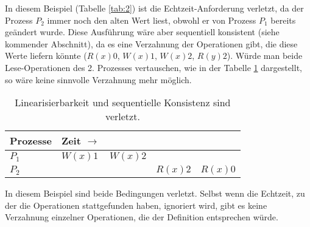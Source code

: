 In diesem Beispiel (Tabelle \ref{tab:2}) ist die Echtzeit-Anforderung verletzt, da der Prozess $P_{2}$ immer noch den alten Wert liest, obwohl er von Prozess $P_{1}$ bereits geändert wurde. Diese Ausführung wäre aber sequentiell konsistent (siehe kommender Abschnitt), da es eine Verzahnung der Operationen gibt, die diese Werte liefern könnte ($R(x)0$, $W(x)1$, $W(x)2$, $R(y)2$). Würde man beide Lese-Operationen des 2. Prozesses vertauschen, wie in der Tabelle \ref{tab:3} dargestellt, so wäre keine sinnvolle Verzahnung mehr möglich.

\begin{table}
	\centering
		\begin{tabular}{l | l l l l}
		\textbf{Prozesse} & \textbf{Zeit} $\rightarrow$ \\
		\hline
		$P_{1}$ & $W(x)1$ & $W(x)2$ \\
		$P_{2}$ & & & \color{red} $R(x)2$ & \color{red} $R(x)0$ \\

		\end{tabular}
	\caption{Linearisierbarkeit und sequentielle Konsistenz sind verletzt.}
	\label{tab:3}
\end{table}

In diesem Beispiel sind beide Bedingungen verletzt. Selbst wenn die Echtzeit, zu der die Operationen stattgefunden haben, ignoriert wird, gibt es keine Verzahnung einzelner Operationen, die der Definition entsprechen würde.
